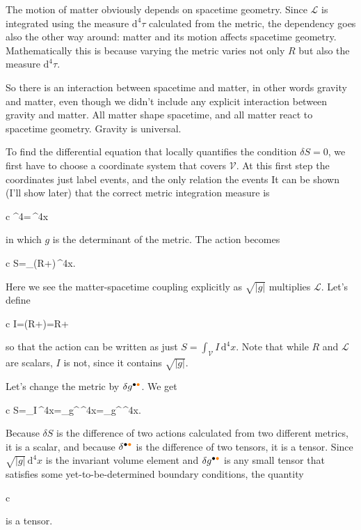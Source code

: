 \documentclass[11pt,oneside%
]{memoir}
\newenvironment{eqna}{\begin{IEEEeqnarray*}{c}}{\end{IEEEeqnarray*}\ignorespacesafterend}
\newcommand{\dd}{\mathrm{d}}
\newcommand{\coa}{{\color{black}\bullet}}
\newcommand{\cob}{{\color{oranssi}\bullet}}
\begin{document}
The motion of matter obviously depends on spacetime geometry. Since \(\mathcal{L}\) is integrated using the measure \(\dd^4\tau\) calculated from the metric, the dependency goes also the other way around: matter and its motion affects spacetime geometry. Mathematically this is because varying the metric varies not only \(R\) but also the measure \(\dd^4\tau\). 

So there is an interaction between spacetime and matter, in other words gravity and matter, even though we didn't include any explicit interaction between gravity and matter. All matter shape spacetime, and all matter react to spacetime geometry. Gravity is universal.

To find the differential equation that locally quantifies the condition \(\delta S=0\), we first have to choose a coordinate system that covers \(\mathcal{V}\). At this first step the coordinates just label events, and the only relation the events It can be shown (I'll show later) that the correct metric integration measure is
\begin{eqna}
\dd^4\tau=\,\dd^4x
\end{eqna}
in which \(g\) is the determinant of the metric. The action becomes
\begin{eqna}
S=\int_{}(R+)\,\dd^4x.
\end{eqna}
Here we see the matter-spacetime coupling explicitly as \(\sqrt{|g|}\) multiplies \(\mathcal{L}\). Let's define
\begin{eqna}
I=(R+)=R+
\end{eqna}
so that the action can be written as just \(S=\int_{\mathcal{V}}I\,\dd^4x\). Note that while \(R\) and \(\mathcal{L}\) are scalars, \(I\) is not, since it contains \(\sqrt{|g|}\).



Let's change the metric by \(\delta g^{\coa\cob}\). We get
\begin{eqna}
\delta S=\int_{}\delta I\,\dd^4x=\int_{}\frac{\delta I}{\delta g^{\coa\cob}}\delta g^{\coa\cob}\,\dd^4x=\int_{}\frac{\delta I}{\delta g^{\coa\cob}}\delta g^{\coa\cob}\,\dd^4x.
\end{eqna}
Because \(\delta S\) is the difference of two actions calculated from two different metrics, it is a scalar, and because \(\delta^{\coa\cob}\) is the difference of two tensors, it is a tensor. Since \(\sqrt{|g|}\,\dd^4x\) is the invariant volume element and \(\delta g^{\coa\cob}\) is any small tensor that satisfies some yet-to-be-determined boundary conditions, the quantity
\begin{eqna}
\frac{\delta I}{\delta g^{\coa\cob}}
\end{eqna}
is a tensor.
\end{document}
